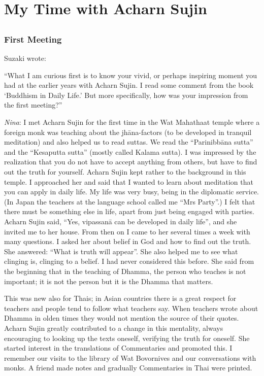 
\part{My Time with Acharn Sujin}
\chapter[First Meeting]{}
\section*{First Meeting}


Suzaki wrote:

``What I am curious first is to know your vivid, or perhaps inspiring
moment you had at the earlier years with Acharn Sujin. I read
some comment from the book `Buddhism in Daily Life.' But more specifically, how was your impression from the first meeting?”

\textit{Nina}: I met Acharn Sujin for the first time in the Wat Mahathaat temple where a foreign monk was teaching about the jhāna-factors (to be developed in tranquil meditation) and also helped us to read suttas. We read the ``Parinibbāna sutta'' and the ``Kesaputta sutta'' (mostly called Kalama sutta). I was impressed by the realization that you do not have to accept anything from others, but have to find out the truth for yourself. Acharn Sujin kept rather to the background in this temple. I approached her and said that I wanted to learn about meditation that you can apply in daily life. My life was very busy, being in the diplomatic service. (In Japan the teachers at the language school called me ``Mrs Party''.) I felt that there must be something else in life, apart from just being engaged with parties. Acharn Sujin said, ``Yes, vipassanā can be developed in daily life'', and she invited me to her house. From then on I came to her several times a week with many questions. I asked her about belief in God and how to find out the truth. She answered: ``What is truth will appear''. She also helped me to see what clinging is, clinging to a belief. I had never considered this before. She said from the beginning that in the teaching of Dhamma, the person who teaches is not important; it is not the person but it is the Dhamma that matters.

This was new also for Thais; in Asian countries there is a great respect for teachers and people tend to follow what teachers say. When teachers wrote about Dhamma in olden times they would not mention the source of their quotes. Acharn Sujin greatly contributed to a change in this mentality, always encouraging to looking up the texts oneself, verifying the truth for oneself. She started interest in the translations of Commentaries and promoted this. I remember our visits to the library of Wat Bovornives and our conversations with monks. A friend made notes and gradually Commentaries in Thai were printed.

